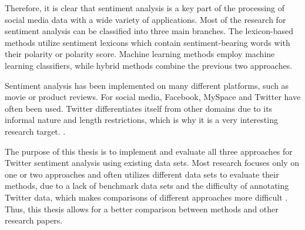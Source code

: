 Therefore, it is clear that sentiment analysis is a key part of the processing of social media data with a wide variety of applications. Most of the research for sentiment analysis can be classified into three main branches. The lexicon-based methods utilize sentiment lexicons which contain sentiment-bearing words with their polarity or polarity score. Machine learning methods employ machine learning classifiers, while hybrid methods combine the previous two approaches.

Sentiment analysis has been implemented on many different platforms, such as movie or product reviews. For social media, Facebook, MySpace and Twitter have often been used. Twitter differentiates itself from other domains due to its informal nature and length restrictions, which is why it is a very interesting research target. \cite{DBLP:journals/csur/GiachanouC16}.

The purpose of this thesis is to implement and evaluate all three approaches for Twitter sentiment analysis using existing data sets. Most research focuses only on one or two approaches and often utilizes different data sets to evaluate their methods, due to a lack of benchmark data sets and the difficulty of annotating Twitter data, which makes comparisons of different approaches more difficult \cite{DBLP:journals/csur/GiachanouC16}. Thus, this thesis allows for a better comparison between methods and other research papers.







